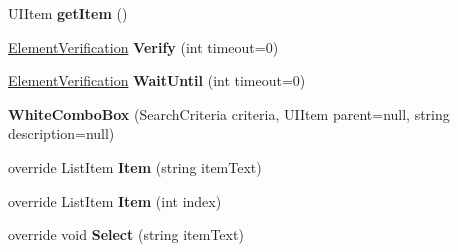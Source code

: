 \begin{DoxyCompactItemize}
\item 
\hypertarget{class_proto_test_1_1_golem_1_1_white_1_1_elements_1_1_white_combo_box_aedffc56dfd6fb110b1f3ca5104f6aef4}{U\-I\-Item {\bfseries get\-Item} ()}\label{class_proto_test_1_1_golem_1_1_white_1_1_elements_1_1_white_combo_box_aedffc56dfd6fb110b1f3ca5104f6aef4}

\item 
\hypertarget{class_proto_test_1_1_golem_1_1_white_1_1_elements_1_1_white_combo_box_adf041b26d3759c9f1df66cd9b0cb3cad}{\hyperlink{class_proto_test_1_1_golem_1_1_white_1_1_element_verification}{Element\-Verification} {\bfseries Verify} (int timeout=0)}\label{class_proto_test_1_1_golem_1_1_white_1_1_elements_1_1_white_combo_box_adf041b26d3759c9f1df66cd9b0cb3cad}

\item 
\hypertarget{class_proto_test_1_1_golem_1_1_white_1_1_elements_1_1_white_combo_box_a6565d258e1d6f1cb59b93bc329432578}{\hyperlink{class_proto_test_1_1_golem_1_1_white_1_1_element_verification}{Element\-Verification} {\bfseries Wait\-Until} (int timeout=0)}\label{class_proto_test_1_1_golem_1_1_white_1_1_elements_1_1_white_combo_box_a6565d258e1d6f1cb59b93bc329432578}

\item 
\hypertarget{class_proto_test_1_1_golem_1_1_white_1_1_elements_1_1_white_combo_box_a6a58a82ddb0cca93b6c58706aba7e786}{{\bfseries White\-Combo\-Box} (Search\-Criteria criteria, U\-I\-Item parent=null, string description=null)}\label{class_proto_test_1_1_golem_1_1_white_1_1_elements_1_1_white_combo_box_a6a58a82ddb0cca93b6c58706aba7e786}

\item 
\hypertarget{class_proto_test_1_1_golem_1_1_white_1_1_elements_1_1_white_combo_box_a5b1e6ec2de536c49e1405d903c281884}{override List\-Item {\bfseries Item} (string item\-Text)}\label{class_proto_test_1_1_golem_1_1_white_1_1_elements_1_1_white_combo_box_a5b1e6ec2de536c49e1405d903c281884}

\item 
\hypertarget{class_proto_test_1_1_golem_1_1_white_1_1_elements_1_1_white_combo_box_a6b3fd3927a603f3be2b1fefe93b1aae0}{override List\-Item {\bfseries Item} (int index)}\label{class_proto_test_1_1_golem_1_1_white_1_1_elements_1_1_white_combo_box_a6b3fd3927a603f3be2b1fefe93b1aae0}

\item 
\hypertarget{class_proto_test_1_1_golem_1_1_white_1_1_elements_1_1_white_combo_box_a43768ba2780a974cb60ecca4c82058c0}{override void {\bfseries Select} (string item\-Text)}\label{class_proto_test_1_1_golem_1_1_white_1_1_elements_1_1_white_combo_box_a43768ba2780a974cb60ecca4c82058c0}


\end{DoxyCompactItemize}
